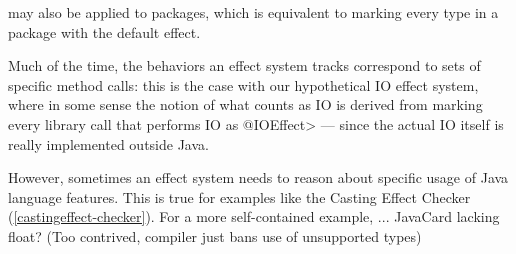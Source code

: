  may also be applied to packages, which is equivalent to marking every type in a package with the default effect.


Much of the time, the behaviors an effect system tracks correspond to sets of specific method calls: this is the case with our hypothetical IO effect system, where in some sense the notion of what counts as IO is derived from marking every library call that performs IO as \<@IOEffect> --- since the actual IO itself is really implemented outside Java.

However, sometimes an effect system needs to reason about specific usage of Java language features. This is true for examples like the Casting Effect Checker (\ref{castingeffect-checker}). For a more self-contained example, ... JavaCard lacking float? (Too contrived, compiler just bans use of unsupported types)


